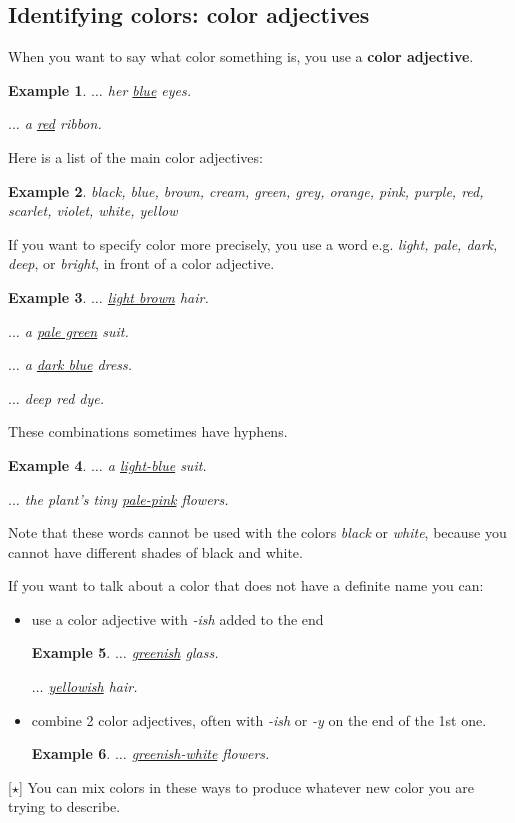 \documentclass[oneside]{book}
\numberwithin{equation}{section}
\newtheorem{example}{Example}[section]
\begin{document}
\subsection{Identifying colors: color adjectives}
\noindent{} When you want to say what color something is, you use a \textbf{color adjective}.
\begin{example}
    $\ldots$ her \underline{blue} eyes.
    
    $\ldots$ a \underline{red} ribbon.
\end{example}
Here is a list of the main color adjectives:
\begin{example}
    black, blue, brown, cream, green, grey, orange, pink, purple, red, scarlet, violet, white, yellow
\end{example}
%
\noindent{} If you want to specify color more precisely, you use a word e.g. \textit{light, pale, dark, deep}, or \textit{bright}, in front of a color adjective.
\begin{example}
    $\ldots$ \underline{light brown} hair.
    
    $\ldots$ a \underline{pale green} suit.
    
    $\ldots$ a \underline{dark blue} dress.
    
    $\ldots$ deep red dye.
\end{example}
These combinations sometimes have hyphens.
\begin{example}
    $\ldots$ a \underline{light-blue} suit.
    
    $\ldots$ the plant's tiny \underline{pale-pink} flowers.
\end{example}
Note that these words cannot be used with the colors \textit{black} or \textit{white}, because you cannot have different shades of black and white.

%
If you want to talk about a color that does not have a definite name you can:
\begin{itemize}
    \item use a color adjective with \textit{-ish} added to the end
    \begin{example}
        $\ldots$ \underline{greenish} glass.
        
        $\ldots$ \underline{yellowish} hair.
    \end{example}
    \item combine 2 color adjectives, often with \textit{-ish} or \textit{-y} on the end of the 1st one.
    \begin{example}
        $\ldots$ \underline{greenish-white} flowers.
    \end{example}
\end{itemize}
%
\noindent{} [$\star$] You can mix colors in these ways to produce whatever new color you are trying to describe.
\end{document}
